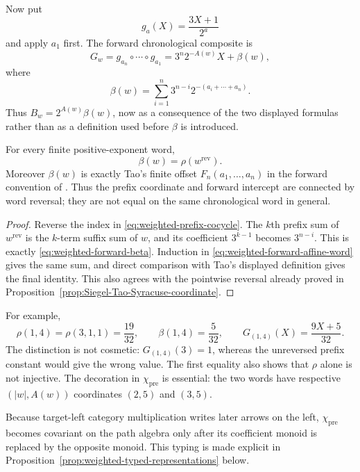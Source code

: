Now put
\[
 g_a(X)=\frac{3X+1}{2^a}
\]
and apply $a_1$ first.  The forward chronological composite is
\begin{equation}
\label{eq:weighted-forward-affine-word}
 G_w=g_{a_n}\circ\cdots\circ g_{a_1}
 =3^n2^{-A(w)}X+\beta(w),
\end{equation}
where
\begin{equation}
\label{eq:weighted-forward-beta}
 \beta(w)=\sum_{i=1}^n3^{n-i}2^{-(a_i+\cdots+a_n)}.
\end{equation}
Thus $B_w=2^{A(w)}\beta(w)$, now as a consequence of the two displayed
formulas rather than as a definition used before $\beta$ is introduced.

\begin{proposition}
\label{prop:weighted-prefix-forward-reversal}
For every finite positive-exponent word,
\[
 \beta(w)=\rho(w^{\mathrm{rev}}).
\]
Moreover $\beta(w)$ is exactly Tao's finite offset $F_n(a_1,\ldots,a_n)$ in
the forward convention of \cite[source lines 208--229 and
384--393]{Tao2026v7}.  Thus the prefix coordinate and forward intercept are
connected by word reversal; they are not equal on the same chronological
word in general.
\end{proposition}

\begin{proof}
Reverse the index in \eqref{eq:weighted-prefix-cocycle}.  The $k$th prefix
sum of $w^{\mathrm{rev}}$ is the $k$-term suffix sum of $w$, and its
coefficient $3^{k-1}$ becomes $3^{n-i}$.  This is exactly
\eqref{eq:weighted-forward-beta}.  Induction in
\eqref{eq:weighted-forward-affine-word} gives the same sum, and direct
comparison with Tao's displayed definition gives the final identity.  This
also agrees with the pointwise reversal already proved in
Proposition~\ref{prop:Siegel-Tao-Syracuse-coordinate}.
\end{proof}

For example,
\[
 \rho(1,4)=\rho(3,1,1)=\frac{19}{32},
 \qquad
 \beta(1,4)=\frac5{32},
 \qquad
 G_{(1,4)}(X)=\frac{9X+5}{32}.
\]
The distinction is not cosmetic: $G_{(1,4)}(3)=1$, whereas the unreversed
prefix constant would give the wrong value.  The first equality also shows
that $\rho$ alone is not injective.  The decoration in $\chi_{\mathrm{pre}}$
is essential: the two words have respective $(|w|,A(w))$ coordinates $(2,5)$
and $(3,5)$.

Because target-left category multiplication writes later arrows on the left,
$\chi_{\mathrm{pre}}$ becomes covariant on the path algebra only after its
coefficient monoid is replaced by the opposite monoid.  This typing is made
explicit in Proposition~\ref{prop:weighted-typed-representations} below.

